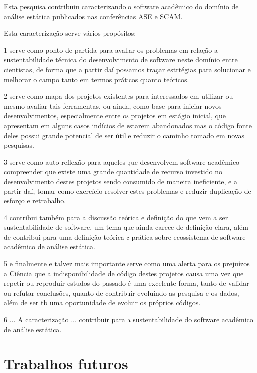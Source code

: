 Esta pesquisa contribuiu caracterizando o software acadêmico do domínio
de análise estática publicados nas conferências ASE e SCAM.

Esta caracterização serve vários propósitos:

1 serve como ponto de partida para avaliar os problemas em relação a sustentabilidade
técnica do desenvolvimento de software neste domínio entre cientistas, de forma
que a partir daí possamos traçar estrtégias para solucionar e melhorar o campo tanto
em termos práticos quanto teóricos.

2 serve como mapa dos projetos existentes para interessados em utilizar ou mesmo
avaliar tais ferramentas, ou ainda, como base para iniciar novos desenvolvimentos,
especialmente entre os projetos em estágio inicial, que apresentam em alguns casos
indícios de estarem abandonados mas o código fonte deles possui grande potencial
de ser útil e reduzir o caminho tomado em novas pesquisas.

3 serve como auto-reflexão para aqueles que desenvolvem software acadêmico
compreender que existe uma grande quantidade de recurso investido no desenvolvimento
destes projetos sendo consumido de maneira ineficiente, e a partir daí, tomar
como exercício resolver estes problemas e reduzir duplicação de esforço e retrabalho.

4 contribui também para a discussão teórica e definição do que vem a ser sustentabilidade
de software, um tema que ainda carece de definição clara, além de contribui para
uma definição teórica e prática sobre ecossistema de software acadêmico de análise estática.

5 e finalmente e talvez mais importante  serve como uma alerta para os prejuízos
a Ciência que a indisponibilidade de código destes projetos causa uma vez que repetir
ou reproduir estudos do passado é uma excelente forma, tanto de validar ou refutar conclusões,
quanto de contribuir evoluindo as pesquisa e os dados, além de ser tb uma oportunidade
de evoluir os próprios códigos.

6 ...  A caracterização ... contribuir para a sustentabilidade do software acadêmico
de análise estática.

\section{Trabalhos futuros}


